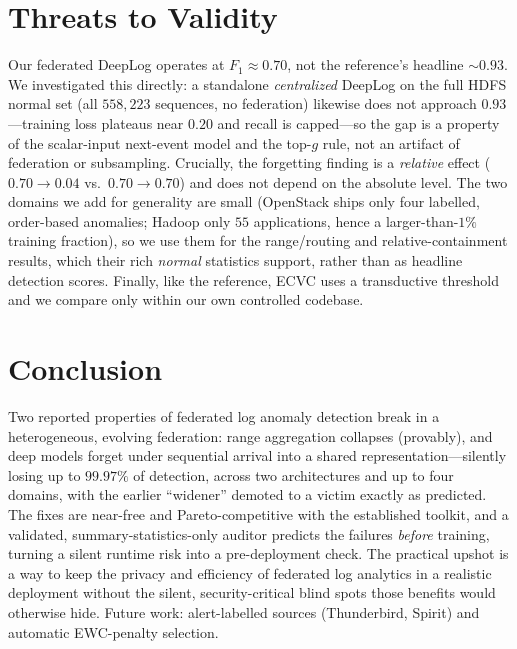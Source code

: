 \documentclass[conference]{IEEEtran}
\begin{document}
\section{Threats to Validity}
Our federated DeepLog operates at $F_1\approx0.70$, not the reference's headline $\sim0.93$. We
investigated this directly: a standalone \emph{centralized} DeepLog on the full HDFS normal set (all
$558{,}223$ sequences, no federation) likewise does not approach $0.93$---training loss plateaus near
$0.20$ and recall is capped---so the gap is a property of the scalar-input next-event model and the
top-$g$ rule, not an artifact of federation or subsampling. Crucially, the forgetting finding is a
\emph{relative} effect ($0.70\!\rightarrow\!0.04$ vs.\ $0.70\!\rightarrow\!0.70$) and does not depend
on the absolute level. The two domains we add for generality are small (OpenStack ships only four
labelled, order-based anomalies; Hadoop only $55$ applications, hence a larger-than-$1\%$ training
fraction), so we use them for the range/routing and relative-containment results, which their rich
\emph{normal} statistics support, rather than as headline detection scores. Finally, like the reference,
ECVC uses a transductive threshold and we compare only within our own controlled codebase.

\section{Conclusion}
Two reported properties of federated log anomaly detection break in a heterogeneous, evolving
federation: range aggregation collapses (provably), and deep models forget under sequential arrival
into a shared representation---silently losing up to $99.97\%$ of detection, across two architectures
and up to four domains, with the earlier ``widener'' demoted to a victim exactly as predicted. The
fixes are near-free and Pareto-competitive with the established toolkit, and a validated,
summary-statistics-only auditor predicts the failures \emph{before} training, turning a silent runtime
risk into a pre-deployment check. The practical upshot is a way to keep the privacy and efficiency of
federated log analytics in a realistic deployment without the silent, security-critical blind spots
those benefits would otherwise hide. Future work: alert-labelled sources (Thunderbird, Spirit) and
automatic EWC-penalty selection.
\end{document}
